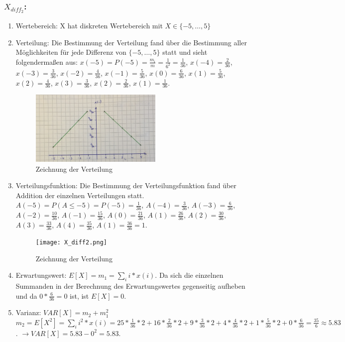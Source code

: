 \documentclass[%
10pt,              %
ngerman,           %
a4paper,           %
DIV11,             %
]{scrartcl}%
\begin{document}
\subsubsection*{$X_{diff_2}$:}

\begin{enumerate}
	\item Wertebereich: X hat diskreten Wertebereich mit $X \in \{-5, \dots, 5 \}$
	\item Verteilung: Die Bestimmung der Verteilung fand über die Bestimmung aller Möglichkeiten für jede Differenz von $\{-5, \dots, 5 \}$ statt und sieht folgendermaßen aus:\newline
	$x(-5) = P(-5) = \frac{m_i}{m} = \frac{1}{6^2} = \frac{1}{36}$,\newline
	$x(-4) = \frac{2}{36}$, $x(-3) = \frac{3}{36}$, $x(-2) = \frac{4}{36}$, $x(-1) = \frac{5}{36}$, $x(0) = \frac{6}{36}$, $x(1) = \frac{5}{36}$, $x(2) = \frac{4}{36}$, $x(3) = \frac{3}{36}$, $x(2) = \frac{2}{36}$, $x(1) = \frac{1}{36}$. 
	
	\begin{figure}[!htbp]
		\centering
		\caption{Zeichnung der Verteilung}
		\includegraphics[width=0.6\textwidth]{X_diff1.png}
	\end{figure}
	
	\item Verteilungsfunktion: Die Bestimmung der Verteilungsfunktion fand über Addition der einzelnen Verteilungen statt.\newline
	$A(-5) = P(A \leq -5) = P(-5) = \frac{1}{36}$,\newline
	$A(-4) = \frac{3}{36}$, $A(-3) = \frac{6}{36}$, $A(-2) = \frac{10}{36}$, $A(-1) = \frac{15}{36}$, $A(0) = \frac{21}{36}$, $A(1) = \frac{26}{36}$, $A(2) = \frac{30}{36}$, $A(3) = \frac{33}{36}$, $A(4) = \frac{35}{36}$, $A(1) = \frac{36}{36} = 1$. 
	
	\begin{figure}[!htbp]
		\centering
		\caption{Zeichnung der Verteilung}
		\texttt{[image: X\_diff2.png]}
	\end{figure} 
	
	\item Erwartungswert: $E[X] = m_1 = \sum_{i} i * x(i)$. Da sich die einzelnen Summanden in der Berechnung des Erwartungswertes gegenseitig aufheben und da $0 * \frac{6}{36} = 0$ ist, ist $E[X] = 0$.
	\item Varianz: $VAR[X] = m_2 + m_1^2$\newline
	$m_2 = E[X^2] = \sum_{i} i^2 * x(i) = 25 * \frac{1}{36} * 2 + 16 * \frac{2}{36} * 2 + 9 * \frac{3}{36} * 2 + 4 * \frac{4}{36} * 2 + 1 * \frac{5}{36} * 2 + 0 * \frac{6}{36} = \frac{35}{6} \approx 5.83$.\newline
	$\rightarrow VAR[X] = 5.83 - 0^2 = 5.83$.
\end{enumerate}
\end{document}
